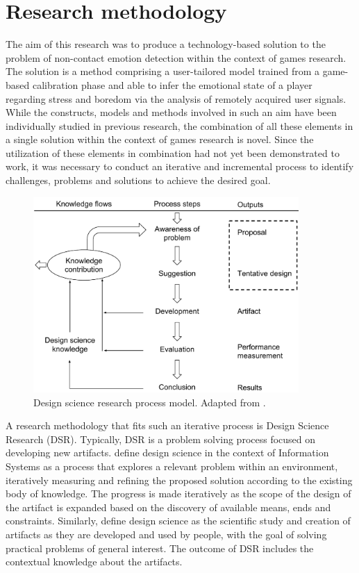 \chapter{Research methodology}
\label{ch:methodology}

The aim of this research was to produce a technology-based solution to the problem of non-contact emotion detection within the context of games research. The solution is a method comprising a user-tailored model trained from a game-based calibration phase and able to infer the emotional state of a player regarding stress and boredom via the analysis of remotely acquired user signals. While the constructs, models and methods involved in such an aim have been individually studied in previous research, the combination of all these elements in a single solution within the context of games research is novel. Since the utilization of these elements in combination had not yet been demonstrated to work, it was necessary to conduct an iterative and incremental process to identify challenges, problems and solutions to achieve the desired goal.

\begin{figure}[h]
    \centering
    \includegraphics[width=0.9\textwidth]{Content/figures/vaishnavi-design-science-process-model}
    \caption{Design science research process model. Adapted from \textcite{vaishnavi2015design}.}
    \label{fig:vaishnavi-design-science-process-model}
\end{figure}

A research methodology that fits such an iterative process is Design Science Research (DSR). Typically, DSR is a problem solving process focused on developing new artifacts. \textcite{hevner2004design} define design science in the context of Information Systems as a process that explores a relevant problem within an environment, iteratively measuring and refining the proposed solution according to the existing body of knowledge. The progress is made iteratively as the scope of the design of the artifact is expanded based on the discovery of available means, ends and constraints. Similarly, \textcite{johannesson2014introduction} define design science as the scientific study and creation of artifacts as they are developed and used by people, with the goal of solving practical problems of general interest. The outcome of DSR includes the contextual knowledge about the artifacts.

